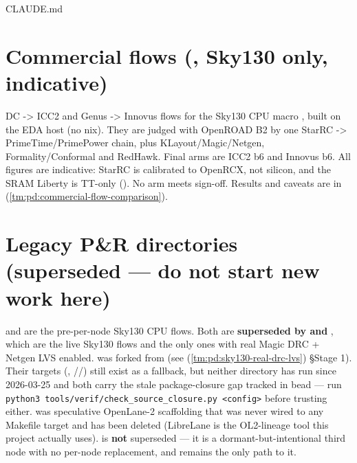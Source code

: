 \begin{relocated}{CLAUDE.md}
{}

\section{\texorpdfstring{Commercial flows (, Sky130
only, indicative)}{Commercial flows (, Sky130 only, indicative)}}\label{tm:pd:node-strategy:commercial-flows-pnrcommercial-sky130-only-indicative}

DC -\textgreater{} ICC2 and Genus -\textgreater{} Innovus flows for the
Sky130 CPU macro , built on the EDA host (no nix).
They are judged with OpenROAD B2 by one StarRC -\textgreater{}
PrimeTime/\allowbreak{}PrimePower chain, plus
KLayout/\allowbreak{}Magic/\allowbreak{}Netgen,
Formality/\allowbreak{}Conformal and RedHawk. Final arms are ICC2 b6 and
Innovus b6. All figures are indicative: StarRC is calibrated to OpenRCX,
not silicon, and the SRAM Liberty is TT-only (). No arm meets
sign-off. Results and caveats are in
 (\cref{tm:pd:commercial-flow-comparison}).

\section{Legacy P\&R directories (superseded --- do not start new work
here)}\label{tm:pd:node-strategy:legacy-pr-directories-superseded-do-not-start-new-work-here}

 and  are the pre-per-node
Sky130 CPU flows. Both are \textbf{superseded by 
and }, which are the live Sky130 flows and the only
ones with real Magic DRC + Netgen LVS enabled.
 was forked from
 (see
 (\cref{tm:pd:sky130-real-drc-lvs}) §Stage 1). Their targets
(,
//) still exist
as a fallback, but neither directory has run since 2026-03-25 and both
carry the stale  package-closure gap tracked in bead
 --- run
\texttt{python3\ tools/\allowbreak{}verif/\allowbreak{}check\_\allowbreak{}source\_\allowbreak{}closure.\allowbreak{}py\ <config>}
before trusting either.  was speculative OpenLane-2
scaffolding that was never wired to any Makefile target and has been
deleted (LibreLane is the OL2-lineage tool this project actually uses).
 is \textbf{not} superseded --- it is a
dormant-but-intentional third node with no per-node replacement, and
 remains the only path to it.


\end{relocated}
